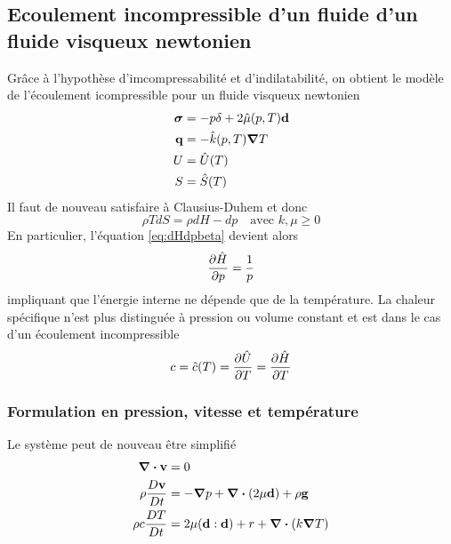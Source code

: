     \subsection{Ecoulement incompressible d'un fluide d'un fluide visqueux newtonien}
      Grâce à l'hypothèse d'imcompressabilité et d'indilatabilité, on obtient le modèle de l'écoulement icompressible pour un fluide visqueux newtonien
      \begin{equation}
        \begin{aligned}
          \boldsymbol{\sigma} &= -p \delta + 2 \hat{\mu}(p, T) \vb{d}\\
          \vb{q} &= -\hat{k}(p, T) \grad T\\
          U &= \hat{U}(T)\\
          S &= \hat{S}(T)
        \end{aligned}
      \end{equation}
      Il faut de nouveau satisfaire à Clausius-Duhem et donc
      \begin{equation}
        \rho T dS = \rho dH -dp \quad \textrm{avec } k,\mu \geq 0
      \end{equation}
      En particulier, l'équation \ref{eq:dHdpbeta} devient alors
      \begin{equation}
        \pdv{\hat{H}}{p} = \frac{1}{p}
      \end{equation}
      impliquant que l'énergie interne ne dépende que de la température. La chaleur spécifique n'est plus distinguée à pression ou volume constant et est dans le cas d'un écoulement incompressible
      \begin{equation}
        c = \hat{c}(T) = \pdv{\hat{U}}{T} = \pdv{\hat{H}}{T}
      \end{equation}

      \subsubsection{Formulation en pression, vitesse et température}
        Le système peut de nouveau être simplifié
        \begin{equation}
          \begin{aligned}
            \div \vb{v} &= 0 \\
            \rho \frac{D \vb{v}}{D t} &= - \grad p + \div (2 \mu \vb{d}) + \rho \vb{g}\\
            \rho c \frac{D T}{D t} &= 2 \mu (\vb{d}:\vb{d}) + r + \div (k \grad T)
          \end{aligned}\label{eq:ConspvT}
        \end{equation}

